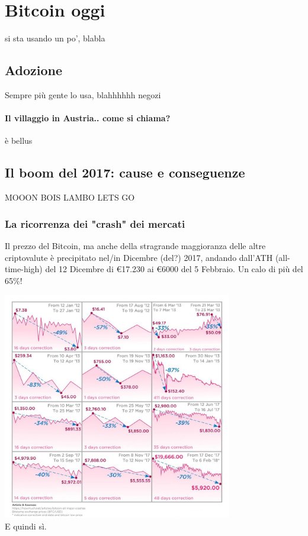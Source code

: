 \documentclass {article}
\begin{document}
\section {Bitcoin oggi}


si sta usando un po', blabla


\subsection {Adozione}


Sempre più gente lo usa, blahhhhhh negozi


\paragraph {Il villaggio in Austria.. come si chiama?}


è bellus


\subsection {Il boom del 2017: cause e conseguenze}


MOOON BOIS LAMBO LETS GO


\subsubsection {La ricorrenza dei "crash" dei mercati}


Il prezzo del Bitcoin, ma anche della stragrande maggioranza delle altre criptovalute è precipitato nel/in Dicembre (del?) 2017, andando dall'ATH (all-time-high) del 12 Dicembre di \euro{}17.230 ai \euro{}6000 del 5 Febbraio. Un calo di più del 65\%!

\vspace {0.5cm}
\includegraphics [width = 10cm] {media/crash.jpg}
\vspace {0.5cm}
\\
E quindi sì.
\end{document}
